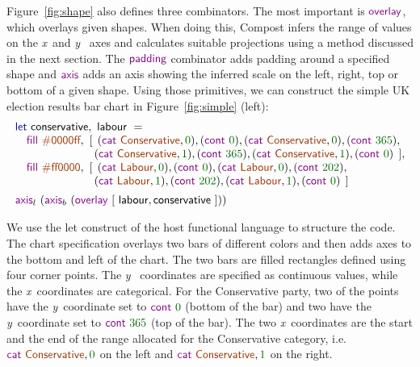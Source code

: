 \documentclass{jfp}
\newcommand{\X}{\emph{x}\ }
\newcommand{\Y}{\emph{y}\ }
\newcommand{\num}[1]{\textcolor{numclr}{#1}}
\newcommand{\strf}[1]{\textnormal{\textcolor{strclr}{\sffamily #1}}}
\newcommand{\ident}[1]{\textnormal{\textcolor{idclr}{\sffamily #1}}}
\newcommand{\kvd}[1]{\textnormal{\textcolor{kvdclr}{\sffamily #1}}}
\newcommand{\fkvd}[1]{\textnormal{\textcolor{fkvdclr}{\sffamily #1}}}
\begin{document}
Figure~\ref{fig:shape} also defines three combinators. The most important is $\kvd{overlay}$,
which overlays given shapes. When doing this, Compost infers the range of values on the \X and \Y
axes and calculates suitable projections using a method discussed in the next
section. The $\kvd{padding}$ combinator adds padding around a specified shape and $\kvd{axis}$ adds
an axis showing the inferred scale on the left, right, top or bottom of a given shape.
Using those primitives, we can construct the simple UK election results bar chart in Figure~\ref{fig:simple} (left):
%
\begin{equation*}
\begin{array}{l}
\fkvd{let}~\ident{conservative},~\ident{labour}~=\\
\quad \kvd{fill}~\strf{\#0000ff},
 ~[\;\,(\kvd{cat}~\strf{Conservative}, \num{0}), (\kvd{cont}~\num{0}), (\kvd{cat}~\strf{Conservative}, \num{0}), (\kvd{cont}~\num{365}),\\
\hspace{6.7em}\;(\kvd{cat}~\strf{Conservative}, \num{1}), (\kvd{cont}~\num{365}), (\kvd{cat}~\strf{Conservative}, \num{1}), (\kvd{cont}~\num{0})\;\,],\\
\quad \kvd{fill}~\strf{\#ff0000},
 ~[\;\,(\kvd{cat}~\strf{Labour}, \num{0}), (\kvd{cont}~\num{0}), (\kvd{cat}~\strf{Labour}, \num{0}), (\kvd{cont}~\num{202}),\\
\hspace{6.7em}\;(\kvd{cat}~\strf{Labour}, \num{1}), (\kvd{cont}~\num{202}), (\kvd{cat}~\strf{Labour}, \num{1}), (\kvd{cont}~\num{0})\,\;]\\[0.5em]
\kvd{axis}_l~(\kvd{axis}_b~(\kvd{overlay}~[~\ident{labour}, \ident{conservative}~]))\\
\end{array}
\end{equation*}

\vspace{-0.25em}
\noindent
We use the \fkvd{let} construct of the host functional language to structure the code. The chart
specification overlays two bars of different colors and then adds axes to the bottom and left of the chart.
The two bars are filled rectangles defined using four corner points. The \Y
coordinates are specified as continuous values, while the \X coordinates are categorical. For
the Conservative party, two of the points have the \Y coordinate set to $\kvd{cont}~\num{0}$ (bottom of the bar)
and two have the \Y coordinate set to $\kvd{cont}~\num{365}$ (top of the bar). The two \X coordinates
are the start and the end of the range allocated for the \strf{Conservative} category,
i.e.~$\kvd{cat}~\strf{Conservative}, \num{0}$ on the left and $\kvd{cat}~\strf{Conservative}, \num{1}$
on the right.
\end{document}

